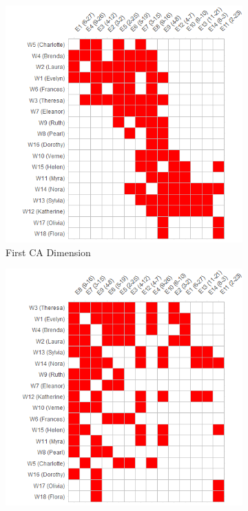 \documentclass[a4paper,fleqn]{cas-sc}
\begin{document}
\begin{figure}[ht!]
    \captionsetup[subfigure]{font=footnotesize,labelfont=footnotesize}
    \centering
     \begin{subfigure}[b]{0.45\textwidth}
        \includegraphics[width=1.0\textwidth]{Plots/ca-reord1.png}
            \caption{First CA Dimension}
            \label{fig:ca-reord1}
    \end{subfigure}
     \begin{subfigure}[b]{0.45\textwidth}
        \includegraphics[width=1.0\textwidth]{Plots/bon-reord1.png}

\end{subfigure}
\end{figure}
\end{document}
